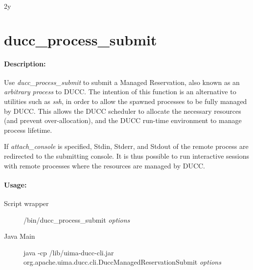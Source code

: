 % 
% 
% 
% 
2y%
\ifpdf
\else
{}
\fi
    \section{ducc\_process\_submit}
    \label{sec:cli.ducc-process-submit}
    \paragraph{Description:}
       Use {\em ducc\_process\_submit} to submit a Managed Reservation, also known as an
       {\em arbitrary process} to DUCC.  The intention
       of this function is an alternative to utilities such as {\em ssh}, in order to allow the
       spawned processes to be fully managed by DUCC.  This allows the DUCC scheduler to allocate
       the necessary resources (and prevent over-allocation), and the DUCC run-time environment
       to manage process lifetime.

       If {\em attach\_console} is specified, Stdin, Stderr, and Stdout of the remote
       process are redirected to the submitting console.  It is thus possible to run interactive
       sessions with remote processes where the resources are managed by DUCC.

    \paragraph{Usage:}
    \begin{description}
    \item[Script wrapper] \ducchome/bin/ducc\_process\_submit {\em options}
    \item[Java Main]      java -cp \ducchome/lib/uima-ducc-cli.jar org.apache.uima.ducc.cli.DuccManagedReservationSubmit {\em options}
    \end{description}


